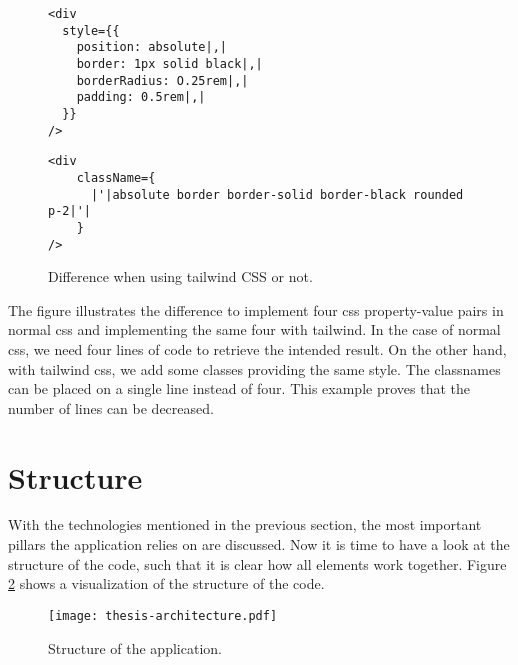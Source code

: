 \begin{figure}[H]
	\begin{minipage}[b]{0.5\textwidth}
 		\centering
  		\begin{verbatim}
<div
  style={{
    position: absolute|,|
    border: 1px solid black|,|
    borderRadius: O.25rem|,|
    padding: 0.5rem|,|
  }}
/>
		\end{verbatim}
		\label{lst:no-tailwind}
	\end{minipage}
 	\begin{minipage}[b]{0.5\textwidth}
  		\centering
		\begin{verbatim}
<div
    className={
      |'|absolute border border-solid border-black rounded p-2|'|
    }
/>
		\end{verbatim}
		\label{lst:tailwind}
 	\end{minipage}
	\caption{Difference when using tailwind CSS or not.}
	\label{fig:examplecode-tailwindcss}
\end{figure}

The figure illustrates the difference to implement four css property-value pairs in normal css and implementing the same four with tailwind. In the case of normal css, we need four lines of code to retrieve the intended result. On the other hand, with tailwind css, we add some classes providing the same style. The classnames can be placed on a single line instead of four. This example proves that the number of lines can be decreased.





\section{Structure}\label{sec:structure}
With the technologies mentioned in the previous section, the most important pillars the application relies on are discussed. Now it is time to have a look at the structure of the code, such that it is clear how all elements work together. Figure \ref{fig:overall-structure} shows a visualization of the structure of the code.
\begin{figure}[H]
	\centering
	\texttt{[image: thesis-architecture.pdf]}
	\caption{Structure of the application.}
	\label{fig:overall-structure}
\end{figure}

